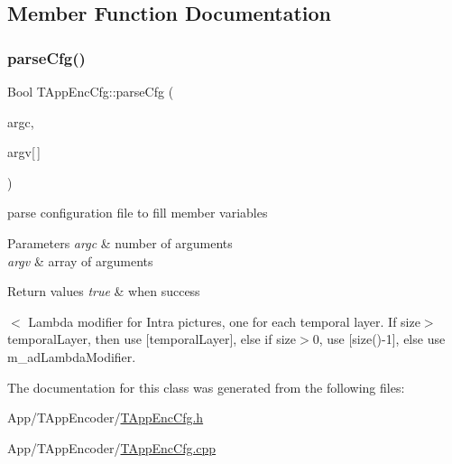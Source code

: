 \subsection{Member Function Documentation}
\mbox{\label{class_t_app_enc_cfg_acb6272dfc9df18c30b610cd135c08085}} 
\subsubsection{\texorpdfstring{parse\+Cfg()}{parseCfg()}}
{\footnotesize\ttfamily Bool T\+App\+Enc\+Cfg\+::parse\+Cfg (\begin{DoxyParamCaption}\item[{Int}]{argc,  }\item[{T\+Char $\ast$}]{argv\mbox{[}$\,$\mbox{]} }\end{DoxyParamCaption})}



parse configuration file to fill member variables 


\begin{DoxyParams}{Parameters}
{\em argc} & number of arguments \\
\hline
{\em argv} & array of arguments \\
\hline
\end{DoxyParams}

\begin{DoxyRetVals}{Return values}
{\em true} & when success \\
\hline
\end{DoxyRetVals}
$<$ Lambda modifier for Intra pictures, one for each temporal layer. If size$>$temporal\+Layer, then use \mbox{[}temporal\+Layer\mbox{]}, else if size$>$0, use \mbox{[}size()-\/1\mbox{]}, else use m\+\_\+ad\+Lambda\+Modifier. 

The documentation for this class was generated from the following files\+:\begin{DoxyCompactItemize}
\item 
App/\+T\+App\+Encoder/\hyperlink{_t_app_enc_cfg_8h}{T\+App\+Enc\+Cfg.\+h}\item 
App/\+T\+App\+Encoder/\hyperlink{_t_app_enc_cfg_8cpp}{T\+App\+Enc\+Cfg.\+cpp}\end{DoxyCompactItemize}

